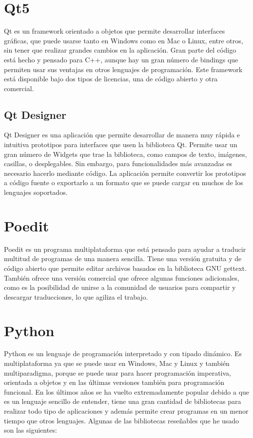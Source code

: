 \section{Qt5}
Qt es un framework orientado a objetos que permite desarrollar interfaces gráficas, que puede usarse tanto en Windows como en Mac o Linux, entre otros, sin tener que realizar grandes cambios en la aplicación. Gran parte del código está hecho y pensado para C++, aunque hay un gran número de bindings que permiten usar sus ventajas en otros lenguajes de programación. Este framework está disponible bajo dos tipos de licencias, una de código abierto y otra comercial.
\subsection{Qt Designer}
Qt Designer es una aplicación que permite desarrollar de manera muy rápida e intuitiva prototipos para interfaces que usen la biblioteca Qt. Permite usar un gran número de Widgets que trae la biblioteca, como campos de texto, imágenes, casillas, o desplegables. Sin embargo, para funcionalidades más avanzadas es necesario hacerlo mediante código. La aplicación permite convertir los prototipos a código fuente o exportarlo a un formato que se puede cargar en muchos de los lenguajes soportados.

\section{Poedit}
Poedit es un programa multiplataforma que está pensado para ayudar a traducir multitud de programas de una manera sencilla. Tiene una versión gratuita y de código abierto que permite editar archivos basados en la biblioteca GNU gettext. También ofrece una versión comercial que ofrece algunas funciones adicionales, como es la posibilidad de unirse a la comunidad de usuarios para compartir y descargar traducciones, lo que agiliza el trabajo.

\section{Python}
Python es un lenguaje de programación interpretado y con tipado dinámico. Es multiplataforma ya que se puede usar en Windows, Mac y Linux y también multiparadigma, porque se puede usar para hacer programación imperativa, orientada a objetos y en las últimas versiones también para programación funcional.
En los últimos años se ha vuelto extremadamente popular debido a que es un lenguaje sencillo de entender, tiene una gran cantidad de bibliotecas para realizar todo tipo de aplicaciones y además permite crear programas en un menor tiempo que otros lenguajes.
Algunas de las bibliotecas reseñables que he usado son las siguientes:
